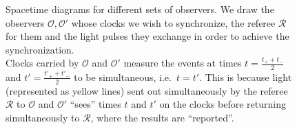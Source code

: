 \begin{figure}
\begin{minipage}{0.5\textwidth}
{
		}
	\end{minipage}%
	\begin{minipage}{0.5\textwidth}
		\caption{Spacetime diagrams for different sets of observers. We draw the observers $\mathcal{O}, \mathcal{O}'$ whose clocks we wish to synchronize, the referee $\mathcal{R}$ for them and the light pulses they exchange in order to achieve the synchronization.\\
		Clocks carried by $\mathcal{O}$ and $\mathcal{O}'$ measure the events at times $t = \frac{t_+ + t_-}{2}$ and $t' = \frac{t'_+ + t'_-}{2}$ to be simultaneous, i.e.~$t = t'$. This is because light (represented as yellow lines) sent out simultaneously by the referee $\mathcal{R}$ to $\mathcal{O}$ and $\mathcal{O}'$ \enquote{sees} times $t$ and $t'$ on the clocks before returning simultaneously to $\mathcal{R}$, where the results are \enquote{reported}.}
		\label{fig:clocks_at_rest_wrt_each_other}
	\end{minipage}
\end{figure}



